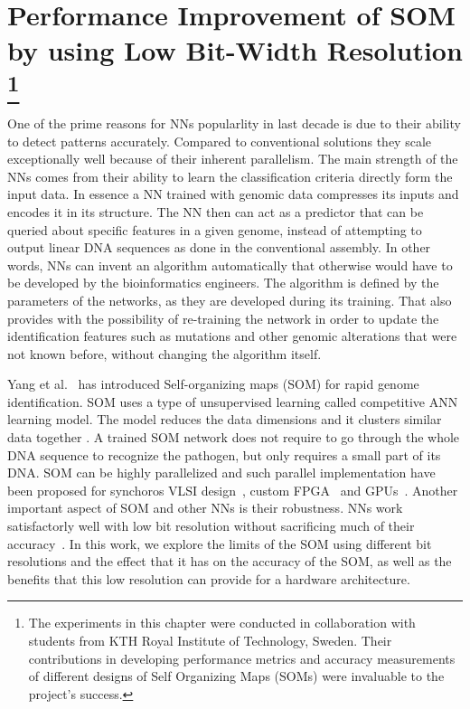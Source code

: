 \graphicspath{{./Ch5-SOM/images/}}

\chapter[Performance Improvement of SOM by using Low Bit-Width Resolution]{Performance Improvement of SOM by using Low Bit-Width Resolution \footnote{The experiments in this chapter were conducted in collaboration with students from KTH Royal Institute of Technology, Sweden. Their contributions in developing performance metrics and accuracy measurements of different designs of Self Organizing Maps (SOMs) were invaluable to the project's success.}} 
\label{chap:SOM}
One of the prime reasons for NNs popularlity in last decade is due to their ability to detect patterns accurately. Compared to conventional solutions they scale exceptionally well because of their inherent parallelism. The main strength of the NNs comes from their ability to learn the classification criteria directly form the input data. In essence a NN trained with genomic data compresses its inputs and encodes it in its structure. The NN then can act as a predictor that can be queried about specific features in a given genome, instead of attempting to output linear DNA sequences as done in the conventional assembly. In other words, NNs can invent an algorithm automatically that otherwise would have to be developed by the bioinformatics engineers. The algorithm is defined by the parameters of the networks, as they are developed during its training. That also provides with the possibility of re-training the network in order to update the identification features such as mutations and other genomic alterations that were not known before, without changing the algorithm itself.

Yang et al.~\cite{Yang2018RiBoSOM} has introduced Self-organizing maps (SOM) for rapid genome identification. SOM uses a type of unsupervised learning called competitive ANN learning model. The model reduces the data dimensions and it clusters similar data together \cite{Kohonen2013}. A trained SOM network does not require to go through the whole DNA sequence to recognize the pathogen, but only requires a small part of its DNA. SOM can be highly parallelized and such parallel implementation have been proposed for synchoros VLSI design~\cite{Yang2018RiBoSOM}, custom FPGA~\cite{Porrmann2006} and GPUs~\cite{McConnell2012}. Another important aspect of SOM and other NNs is their robustness. NNs work satisfactorly well with low bit resolution without sacrificing much of their accuracy~\cite{8056820}. In this work, we explore the limits of the SOM using different bit resolutions and the effect that it has on the accuracy of the SOM, as well as the benefits that this low resolution can provide for a hardware architecture. 

